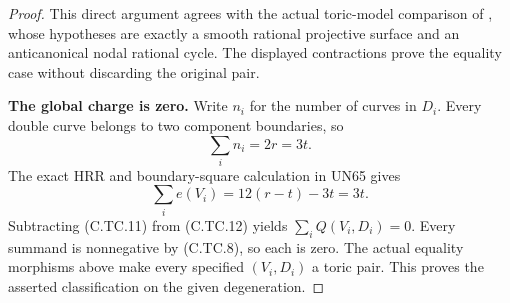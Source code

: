\begin{proof}
This direct argument agrees with
the actual toric-model comparison
of \cite[Definition 1.2 and Proposition 1.3]{GHK2015},
whose hypotheses are exactly a
smooth rational projective surface
and an anticanonical nodal rational
cycle. The displayed contractions
prove the equality case without
discarding the original pair.

\par\medskip\noindent\textbf{The global charge is zero.}
Write $n_i$ for the number of
curves in $D_i$. Every double
curve belongs to two component
boundaries, so
\[
                         \sum_i n_i=2r=3t.
\tag{C.TC.11}
\]
The exact HRR and boundary-square
calculation in UN65 gives
\[
            \sum_i e(V_i)
             =12(r-t)-3t=3t.
\tag{C.TC.12}
\]
Subtracting (C.TC.11) from
(C.TC.12) yields
$\sum_i Q(V_i,D_i)=0$.
Every summand is nonnegative by
(C.TC.8), so each is zero.
The actual equality morphisms
above make every specified
$(V_i,D_i)$ a toric pair.
This proves the asserted
classification on the given
degeneration.
\end{proof}
